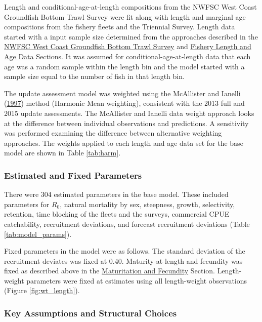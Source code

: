 \documentclass[12pt,]{article}
\begin{document}
Length and conditional-age-at-length compositions from the NWFSC West
Coast Groundfish Bottom Trawl Survey were fit along with length and
marginal age compositions from the fishery fleets and the Triennial
Survey. Length data started with a input sample size determined from the
approaches described in the \protect\hyperlink{nwfsc_survey}{NWFSC West
Coast Groundfish Bottom Trawl Survey} and
\protect\hyperlink{fishery_data}{Fishery Length and Age Data} Sections.
It was assumed for conditional-age-at-length data that each age was a
random sample within the length bin and the model started with a sample
size equal to the number of fish in that length bin.

The update assessment model was weighted using the McAllister and
Ianelli (\protect\hyperlink{ref-mcallister_bayesian_1997}{1997}) method
(Harmonic Mean weighting), consistent with the 2013 full and 2015 update
assessments. The McAllister and Ianelli data weight approach looks at
the difference between individual observations and predictions. A
sensitivity was performed examining the difference between alternative
weighting approaches. The weights applied to each length and age data
set for the base model are shown in Table \ref{tab:harm}.

\subsubsection{Estimated and Fixed
Parameters}\label{estimated-and-fixed-parameters}

There were 304 estimated parameters in the base model. These included
parameters for \(R_0\), natural mortality by sex, steepness, growth,
selectivity, retention, time blocking of the fleets and the surveys,
commercial CPUE catchability, recruitment deviations, and forecast
recruitment deviations (Table \ref{tab:model_params}).

Fixed parameters in the model were as follows. The standard deviation of
the recruitment deviates was fixed at 0.40. Maturity-at-length and
fecundity was fixed as described above in the
\protect\hyperlink{mat_fecund}{Maturitation and Fecundity} Section.
Length-weight parameters were fixed at estimates using all length-weight
observations (Figure \ref{fig:wt_length}).

\subsubsection{Key Assumptions and Structural
Choices}\label{key-assumptions-and-structural-choices}
\end{document}
